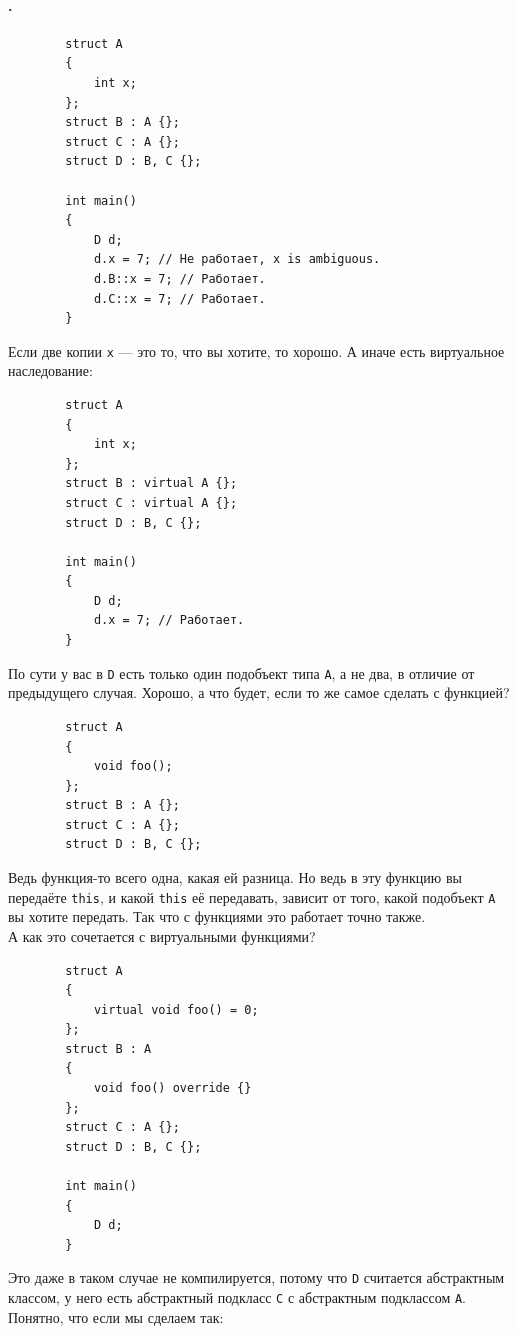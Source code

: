 \documentclass{article}
\begin{document}
    \paragraph{.}
    \begin{verbatim}
        struct A
        {
            int x;
        };
        struct B : A {};
        struct C : A {};
        struct D : B, C {};

        int main()
        {
            D d;
            d.x = 7; // Не работает, x is ambiguous.
            d.B::x = 7; // Работает.
            d.C::x = 7; // Работает.
        }
    \end{verbatim}
    Если две копии \texttt{x} --- это то, что вы хотите, то хорошо. А иначе есть виртуальное наследование:
    \begin{verbatim}
        struct A
        {
            int x;
        };
        struct B : virtual A {};
        struct C : virtual A {};
        struct D : B, C {};
        
        int main()
        {
            D d;
            d.x = 7; // Работает.
        }
    \end{verbatim}
    По сути у вас в \texttt{D} есть только один подобъект типа \texttt{A}, а не два, в отличие от предыдущего случая. Хорошо, а что будет, если то же самое сделать с функцией?
    \begin{verbatim}
        struct A
        {
            void foo();
        };
        struct B : A {};
        struct C : A {};
        struct D : B, C {};
    \end{verbatim}
    Ведь функция-то всего одна, какая ей разница. Но ведь в эту функцию вы передаёте \texttt{this}, и какой \texttt{this} её передавать, зависит от того, какой подобъект \texttt{A} вы хотите передать. Так что с функциями это работает точно также.\\
    А как это сочетается с виртуальными функциями?
    \begin{verbatim}
        struct A
        {
            virtual void foo() = 0;
        };
        struct B : A
        {
            void foo() override {}
        };
        struct C : A {};
        struct D : B, C {};
        
        int main()
        {
            D d;
        }
    \end{verbatim}
    Это даже в таком случае не компилируется, потому что \texttt{D} считается абстрактным классом, у него есть абстрактный подкласс \texttt{C} с абстрактным подклассом \texttt{A}. Понятно, что если мы сделаем так:
\end{document}
